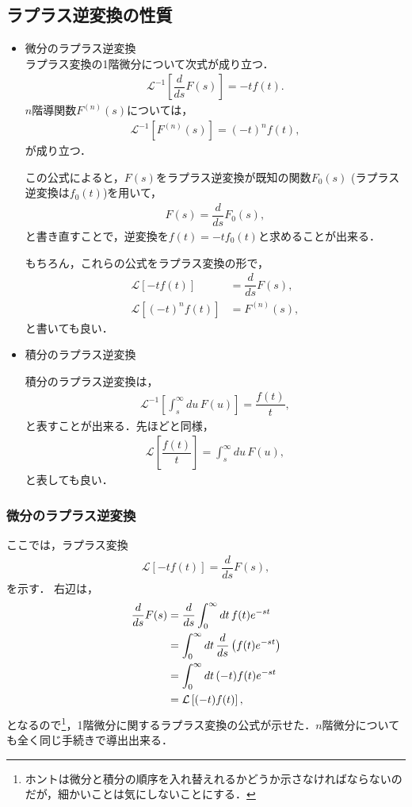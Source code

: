 \subsection{ラプラス逆変換の性質}
%
\begin{itemize}
  \item 微分のラプラス逆変換\\
%
ラプラス変換の1階微分について次式が成り立つ．
\begin{align}
 \mathcal{L}^{-1}\left[\dfrac{d}{ds}F(s)\right] = -tf(t). \label{invlaplace_diff} 
\end{align}
%
$n$階導関数$F^{(n)}(s)$については，
\begin{align}
 \mathcal{L}^{-1}\left[F^{(n)}(s)\right] = (-t)^n f(t),
\end{align}
が成り立つ．

この公式によると，$F(s)$をラプラス逆変換が既知の関数$F_{0}(s)$ (ラプラス逆変換は$f_0(t)$)を用いて，
\begin{align}
F(s) = \dfrac{d}{ds}F_{0}(s), 
\end{align}
と書き直すことで，逆変換を$f(t)=-tf_0(t)$と求めることが出来る．

もちろん，これらの公式をラプラス変換の形で，
\begin{align}
  \mathcal{L}\left[-tf(t)\right] &= \dfrac{d}{ds}F(s), \\
  \mathcal{L}\left[(-t)^n f(t)\right] &= F^{(n)}(s), 
\end{align}
と書いても良い．
%
\item 積分のラプラス逆変換


積分のラプラス逆変換は，
\begin{align}
  \mathcal{L}^{-1}\left[\int_{s}^{\infty}du\,F(u)\right] = \dfrac{f(t)}{t}, \label{invlaplace_int01}
\end{align}
と表すことが出来る．先ほどと同様，
\begin{align}
  \mathcal{L}\left[\dfrac{f(t)}{t}\right] = \int_{s}^{\infty}du\,F(u),  \label{invlaplace_int02}
\end{align}
と表しても良い．
%
\end{itemize}
%
\subsubsection{微分のラプラス逆変換}
%
ここでは，ラプラス変換
\begin{align}
 \mathcal{L}\left[-tf(t)\right] = \dfrac{d}{ds}F(s),
\end{align}
を示す．
右辺は，
\begin{align}
 \dfrac{d}{ds}F(s) 
  &= \dfrac{d}{ds}\int_{0}^{\infty}dt\,f(t)e^{-st} \notag \\
  &= \int_{0}^{\infty}dt\,\dfrac{d}{ds}\left(f(t)e^{-st}\right) \notag \\
  &= \int_{0}^{\infty}dt\,(-t)f(t)e^{-st}\notag \\
  &= \mathcal{L}\left[(-t)f(t)\right], 
\end{align}
となるので\footnote{ホントは微分と積分の順序を入れ替えれるかどうか示さなければならないのだが，細かいことは気にしないことにする．}，1階微分に関するラプラス変換の公式が示せた．$n$階微分についても全く同じ手続きで導出出来る．
%
